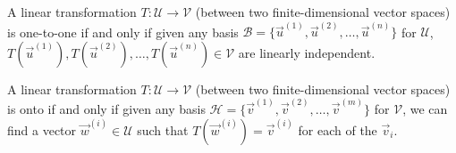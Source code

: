 \begin{thm}
\label{thm:oneto_onebasis}
A linear transformation $T: \mathcal{U} \to \mathcal{V}$ (between two finite-dimensional vector spaces) is one-to-one if and only if given any basis $\mathcal{B} = \{\vec{u}^{(1)}, \vec{u}^{(2)}, \ldots, \vec{u}^{(n)}\}$ for $\mathcal{U}$, $T(\vec{u}^{(1)}), T(\vec{u}^{(2)}), \ldots, T(\vec{u}^{(n)}) \in \mathcal{V}$ are linearly independent.
\end{thm}
\begin{thm}
\label{thm:onto_basis}
A linear transformation $T: \mathcal{U} \to \mathcal{V}$ (between two finite-dimensional vector spaces) is onto if and only if given any basis $\mathcal{H} = \{\vec{v}^{(1)}, \vec{v}^{(2)}, \ldots, \vec{v}^{(m)}\}$ for $\mathcal{V}$, we can find a vector $\vec{w}^{(i)} \in \mathcal{U}$ such that $T(\vec{w}^{(i)}) = \vec{v}^{(i)}$ for each of the $\vec{v}_i$.
\end{thm}
